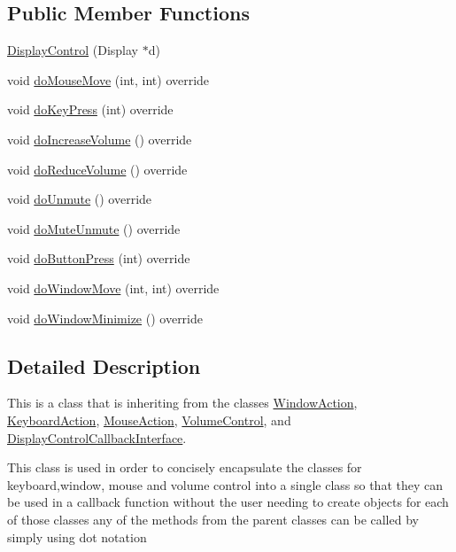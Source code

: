 \subsection*{Public Member Functions}
\begin{DoxyCompactItemize}
\item 
\hyperlink{classDisplayControl_a4d2a5053b250bbd1f3103795cb29fcde}{Display\+Control} (Display $\ast$d)
\item 
void \hyperlink{classDisplayControl_aa8c509a1e17ba12d164dcfe43cf281d4}{do\+Mouse\+Move} (int, int) override
\item 
void \hyperlink{classDisplayControl_aa5af48425f7ba40012b2a7db5fabed45}{do\+Key\+Press} (int) override
\item 
void \hyperlink{classDisplayControl_a8a361b4c25ef55b86b5c2d178ffa516f}{do\+Increase\+Volume} () override
\item 
void \hyperlink{classDisplayControl_a874fa3f6b3e4cf465db62a4eba1c1dd1}{do\+Reduce\+Volume} () override
\item 
void \hyperlink{classDisplayControl_a210411b559d8c3ffb1498f49cfa26a6d}{do\+Unmute} () override
\item 
void \hyperlink{classDisplayControl_a25f685ea6bf001e53c7d17410f2a24ea}{do\+Mute\+Unmute} () override
\item 
void \hyperlink{classDisplayControl_a5f45c36e699afa1d56b2af78e5125aca}{do\+Button\+Press} (int) override
\item 
void \hyperlink{classDisplayControl_aca4208c53cac28e164e7949effdc04cd}{do\+Window\+Move} (int, int) override
\item 
void \hyperlink{classDisplayControl_ad5fa763a77c680ce7b2089c6d79c4eb7}{do\+Window\+Minimize} () override
\end{DoxyCompactItemize}


\subsection{Detailed Description}
This is a class that is inheriting from the classes \hyperlink{classWindowAction}{Window\+Action}, \hyperlink{classKeyboardAction}{Keyboard\+Action}, \hyperlink{classMouseAction}{Mouse\+Action}, \hyperlink{classVolumeControl}{Volume\+Control}, and \hyperlink{classDisplayControlCallbackInterface}{Display\+Control\+Callback\+Interface}. 

This class is used in order to concisely encapsulate the classes for keyboard,window, mouse and volume control into a single class so that they can be used in a callback function without the user needing to create objects for each of those classes any of the methods from the parent classes can be called by simply using dot notation 

